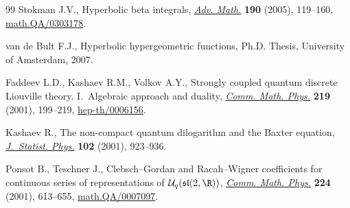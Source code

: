 \documentclass[pdftex]{sigma}
\numberwithin{equation}{section}
\begin{document}
\begin{thebibliography}{99}
Stokman J.V.,
Hyperbolic beta integrals,
\href{http://dx.doi.org/10.1016/j.aim.2003.12.003}{{\it Adv. Math.}} {\bf 190} (2005), 119--160,
\href{http://arxiv.org/abs/math.QA/0303178}{math.QA/0303178}.

van de Bult F.J.,
Hyperbolic hypergeometric functions,
 Ph.D. Thesis, University of Amsterdam, 2007.

Faddeev L.D., Kashaev R.M., Volkov A.Y.,
Strongly coupled quantum discrete Liouville theory. I.~Algebraic approach and duality,
\href{http://dx.doi.org/10.1007/s002200100412}{{\it Comm. Math. Phys.}} {\bf 219} (2001), 199--219,
\href{http://arxiv.org/abs/hep-th/0006156}{hep-th/0006156}.

Kashaev R.,
The non-compact quantum dilogarithm and the Baxter equation,
\href{http://dx.doi.org/10.1023/A:1004859121464}{{\it J.~Statist. Phys.}} {\bf 102} (2001), 923--936.

Ponsot B.,  Teschner J.,
Clebsch--Gordan and Racah--Wigner coef\/f\/icients for continuous series of representations of ${\mathcal U}_q(\mathfrak{sl}(2,\R))$,
\href{http://dx.doi.org/10.1007/PL00005590}{{\it Comm. Math. Phys.}} {\bf 224} (2001), 613--655,
\href{http://arxiv.org/abs/math.QA/0007097}{math.QA/0007097}.

\end{thebibliography}\LastPageEnding
\end{document}
